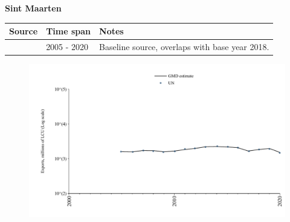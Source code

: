\documentclass[12pt,a4paper,landscape]{article}
\begin{document}
\begin{adjustbox}{max totalsize={\paperwidth}{\paperheight},center}
\begin{minipage}[t][\textheight][t]{\textwidth}
\vspace*{0.5cm}
{}
\begin{center}
{\Large\bfseries Sint Maarten}
\end{center}
\vspace{0.5cm}
\begin{table}[H]
\centering
\small
\begin{tabular}{|l|l|l|}
\hline
\textbf{Source} & \textbf{Time span} & \textbf{Notes} \\
\hline
\rowcolor{white}\cite{UN}& 2005 - 2020 &Baseline source, overlaps with base year 2018.\\
\hline
\end{tabular}
\end{table}
\begin{figure}[H]
\centering
\includegraphics[width=\textwidth,height=0.6\textheight,keepaspectratio]{graphs/SXM_exports.pdf}
\end{figure}
\end{minipage}
\end{adjustbox}
\end{document}
